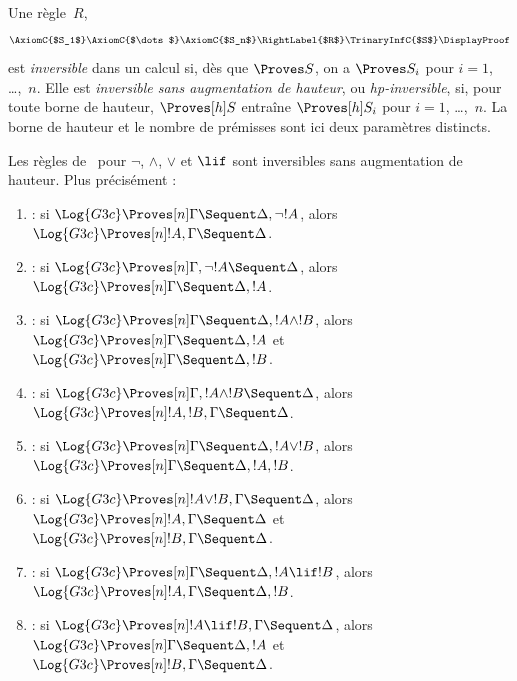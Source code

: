 \documentclass[../../../include/open-logic-section]{subfiles}
\begin{document}


\begin{defn}
Une règle~$R$,
\[
\AxiomC{$S_1$}
\AxiomC{$\dots$}
\AxiomC{$S_n$}
\RightLabel{$R$}
\TrinaryInfC{$S$}
\DisplayProof
\]
est \emph{inversible} dans un calcul si, dès que
$\Proves S$, on a $\Proves S_i$ pour
$i = 1$, \dots,~$n$.
Elle est \emph{inversible sans augmentation de hauteur},
ou \emph{hp-inversible}, si, pour toute borne de hauteur,
$\Proves[h] S$ entraîne $\Proves[h] S_i$
pour $i = 1$, \dots,~$n$.
La borne de hauteur et le nombre de prémisses
sont ici deux paramètres distincts.
\end{defn}

\begin{lem}
Les règles de~ pour $\lnot$, $\land$,
$\lor$ et $\lif$ sont inversibles sans augmentation
de hauteur. Plus précisément :
\begin{enumerate}
  \item \RightR{\lnot} : si
  $\Log{G3c} \Proves[n] \Gamma \Sequent \Delta, \lnot !A$,
  alors $\Log{G3c} \Proves[n] !A, \Gamma \Sequent \Delta$.
  \item \LeftR{\lnot} : si
  $\Log{G3c} \Proves[n] \Gamma, \lnot !A \Sequent \Delta$,
  alors $\Log{G3c} \Proves[n] \Gamma \Sequent \Delta, !A$.
  \item \RightR{\land} : si
  $\Log{G3c} \Proves[n] \Gamma \Sequent \Delta, !A \land !B$,
  alors $\Log{G3c} \Proves[n] \Gamma \Sequent \Delta, !A$
  et $\Log{G3c} \Proves[n] \Gamma \Sequent \Delta, !B$.
  \item \LeftR{\land} : si
  $\Log{G3c} \Proves[n] \Gamma, !A \land !B \Sequent \Delta$,
  alors $\Log{G3c} \Proves[n] !A, !B, \Gamma \Sequent \Delta$.
  \item \RightR{\lor} : si
  $\Log{G3c} \Proves[n] \Gamma \Sequent \Delta, !A \lor !B$,
  alors $\Log{G3c} \Proves[n] \Gamma \Sequent \Delta, !A, !B$.
  \item \LeftR{\lor} : si
  $\Log{G3c} \Proves[n] !A \lor !B, \Gamma \Sequent \Delta$,
  alors $\Log{G3c} \Proves[n] !A, \Gamma \Sequent \Delta$
  et $\Log{G3c} \Proves[n] !B, \Gamma \Sequent \Delta$.
  \item \RightR{\lif} : si
  $\Log{G3c} \Proves[n] \Gamma \Sequent \Delta, !A \lif !B$,
  alors $\Log{G3c} \Proves[n] !A, \Gamma \Sequent \Delta, !B$.
  \item \LeftR{\lif} : si
  $\Log{G3c} \Proves[n] !A \lif !B, \Gamma \Sequent \Delta$,
  alors $\Log{G3c} \Proves[n] \Gamma \Sequent \Delta, !A$
  et $\Log{G3c} \Proves[n] !B, \Gamma \Sequent \Delta$.
\end{enumerate}
\end{lem}
\end{document}
